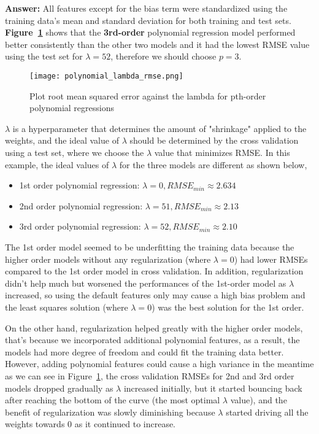 \documentclass[11pt]{report}
\begin{document}
\justify
\textbf{Answer:} All features except for the bias term were standardized using the training data's mean and standard deviation for both training and test sets. \textbf{Figure~\ref{fig:polynomial_lambda_rmse}} shows that the \textbf{3rd-order} polynomial regression model performed better consistently than the other two models and it had the lowest RMSE value using the test set for $\lambda = 52$, therefore we should choose $p=3$.  

\begin{figure}[h]
\texttt{[image: polynomial\_lambda\_rmse.png]}
\centering
\caption{Plot root mean squared error against the lambda for pth-order polynomial regressions}
\label{fig:polynomial_lambda_rmse}
\end{figure}

\justify
$\lambda$ is a hyperparameter that determines the amount of "shrinkage" applied to the weights, and the ideal value of $\lambda$ should be determined by the cross validation using a test set, where we choose the $\lambda$ value that minimizes RMSE. In this example, the ideal values of $\lambda$ for the three models are different as shown below,
\begin{itemize}
	\item 1st order polynomial regression: $\lambda = 0, RMSE_{min} \approx 2.634$
	\item 2nd order polynomial regression: $\lambda = 51, RMSE_{min} \approx 2.13$
	\item 3rd order polynomial regression: $\lambda = 52, RMSE_{min} \approx 2.10$
\end{itemize} 

\justify
The 1st order model seemed to be underfitting the training data because the higher order models without any regularization (where $\lambda = 0$) had lower RMSEs compared to the 1st order model in cross validation. In addition, regularization didn't help much but worsened the performances of the 1st-order model as $\lambda$ increased, so using the default features only may cause a high bias problem and the least squares solution (where $\lambda = 0$) was the best solution for the 1st order. 

\justify
On the other hand, regularization helped greatly with the higher order models, that's because we incorporated additional polynomial features, as a result, the models had more degree of freedom and could fit the training data better. However, adding polynomial features could cause a high variance in the meantime as we can see in Figure~\ref{fig:polynomial_lambda_rmse}, the cross validation RMSEs for 2nd and 3rd order models dropped gradually as $\lambda$ increased initially, but it started bouncing back  after reaching the bottom of the curve (the most optimal $\lambda$ value), and the benefit of regularization was slowly diminishing because $\lambda$ started driving all the weights towards 0 as it continued to increase. 

\justify
\end{document}
